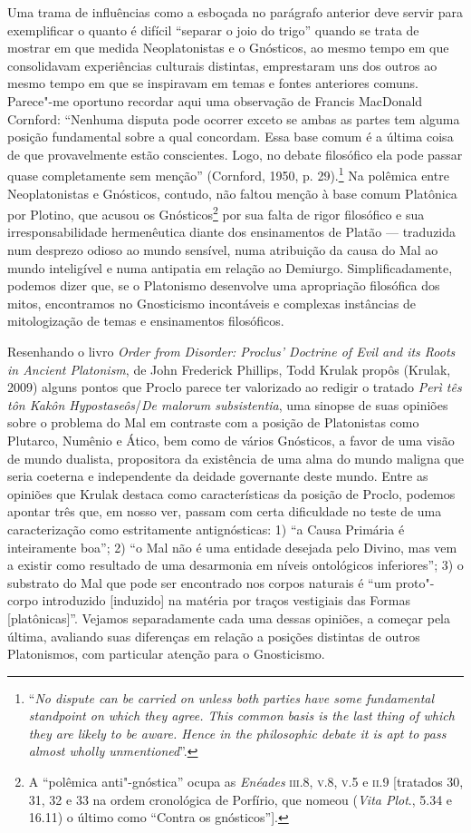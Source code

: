 Uma trama de influências como a esboçada no parágrafo anterior
deve servir para exemplificar o quanto é difícil “separar o joio
do trigo” quando se trata de mostrar em que medida
Neoplatonistas e o Gnósticos, ao mesmo tempo em que consolidavam
experiências culturais distintas, emprestaram uns dos outros ao
mesmo tempo em que se inspiravam em temas e fontes anteriores
comuns. Parece"-me oportuno recordar aqui uma observação de
Francis MacDonald Cornford: “Nenhuma disputa pode ocorrer exceto
se ambas as partes tem alguma posição fundamental sobre a qual
concordam. Essa base comum é a última coisa de que provavelmente
estão conscientes. Logo, no debate filosófico ela pode passar
quase completamente sem menção” (Cornford, 1950, p.
29).\footnote{ “\emph{No dispute can be carried on unless both
parties have some fundamental standpoint on which they agree.
This common basis is the last thing of which they are likely to
be aware. Hence in the philosophic debate it is apt to pass
almost wholly unmentioned}”.} Na polêmica entre Neoplatonistas
e Gnósticos, contudo, não faltou menção à base comum Platônica
por Plotino, que acusou os Gnósticos\footnote{ A “polêmica
anti"-gnóstica” ocupa as \emph{Enéades} \textsc{iii}.8, \textsc{v}.8,
\textsc{v}.5 e
\textsc{ii}.9
[tratados 30, 31, 32 e 33 na ordem cronológica de Porfírio, que
nomeou (\emph{Vita Plot}., 5.34 e 16.11) o último como “Contra
os gnósticos”].} por sua falta de rigor filosófico e sua
irresponsabilidade hermenêutica diante dos ensinamentos de
Platão --- traduzida num desprezo odioso ao mundo sensível, numa
atribuição da causa do Mal ao mundo inteligível e numa antipatia
em relação ao Demiurgo. Simplificadamente, podemos dizer que, se
o Platonismo desenvolve uma apropriação filosófica dos mitos,
encontramos no Gnosticismo incontáveis e complexas instâncias de
mitologização de temas e ensinamentos filosóficos. 

Resenhando o livro \emph{Order from Disorder: Proclus' Doctrine
of Evil and its Roots in Ancient Platonism}, de John Frederick
Phillips, Todd Krulak propôs (Krulak, 2009) alguns pontos que
Proclo parece ter valorizado ao redigir o tratado \emph{Perì
tês tôn Kakôn Hypostaseôs}/\emph{De malorum subsistentia}, uma
sinopse de suas opiniões sobre o problema do Mal em contraste
com a posição de Platonistas como Plutarco, Numênio e Ático, bem
como de vários Gnósticos, a favor de uma visão de mundo
dualista, propositora da existência de uma alma do mundo maligna
que seria coeterna e independente da deidade governante deste
mundo. Entre as opiniões que Krulak destaca como características
da posição de Proclo, podemos apontar três que, em nosso ver,
passam com certa dificuldade no teste de uma caracterização como
estritamente antignósticas: 1) “a Causa Primária é inteiramente
boa”; 2) “o Mal não é uma entidade desejada pelo Divino, mas vem
a existir como resultado de uma desarmonia em níveis ontológicos
inferiores”; 3) o substrato do Mal que pode ser encontrado nos
corpos naturais é “um proto"-corpo introduzido [induzido] na
matéria por traços vestigiais das Formas [platônicas]”. Vejamos
separadamente cada uma dessas opiniões, a começar pela última,
avaliando suas diferenças em relação a posições distintas de
outros Platonismos, com particular atenção para o Gnosticismo. 

